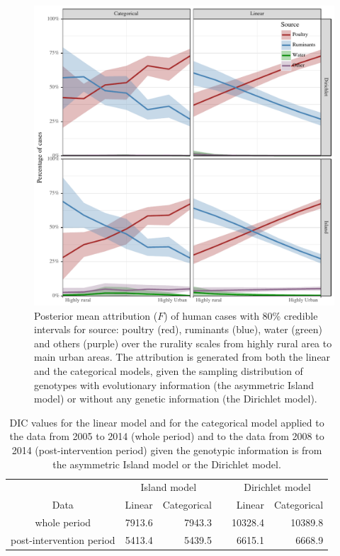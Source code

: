 \documentclass[AMA,STIX1COL]{WileyNJD-v2}
\begin{document}
\begin{figure}
\centering
\includegraphics[width=.9\linewidth]{Figures/attr_all.pdf}
\caption{Posterior mean attribution ($F$) of human cases with 80\% credible intervals for source: poultry (red), ruminants (blue), water (green) and others (purple) over the rurality scales from highly rural area to main urban areas. The attribution is generated from both the linear and the categorical models, given the sampling distribution of genotypes with evolutionary information (the asymmetric Island model) or without any genetic information (the Dirichlet model).}
\label{fig:attribution}
\end{figure}

\begin{table}
  \begin{center}
    \begin{tabular}{crrrrr}
      \toprule
      & \multicolumn{2}{c}{Island model}  & \multicolumn{1}{c}{} & \multicolumn{2}{c}{Dirichlet model} \\
      Data & Linear & Categorical & & Linear & Categorical\\ \midrule
      whole period  & 7913.6 & 7943.3  & & 10328.4  & 10389.8 \\
      post-intervention period  & 5413.4  & 5439.5  & & 6615.1   & 6668.9 \\
      \bottomrule
    \end{tabular}
  \end{center}
  \caption{DIC values for the linear model and for the categorical model applied to the data from 2005 to 2014 (whole period) and to the data from 2008 to 2014 (post-intervention period) given the genotypic information is from the asymmetric Island model or the Dirichlet model.}
  \label{tab:dic}
\end{table}
\end{document}
